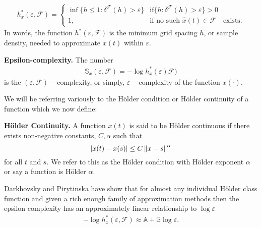   \begin{align*}
    h_x^*(\varepsilon, \mathcal{F}) = \begin{cases}
      \inf \{ h \leq 1 : \delta^{\mathcal{F}}(h) > \varepsilon \} & \text{if} 
      \{ h : \delta^{\mathcal{F}}(h) > \varepsilon \} > 0  \\ 
        1, &  \text{if no such } \hat x(t) \in \mathcal{F} \hspace{1em}\text{exists.}
    \end{cases}
  \end{align*}
  In words, the function $h^*(\varepsilon, \mathcal{F})$ is the minimum grid spacing $h$, or sample density, needed to approximate $x(t)$ within $\varepsilon$. 
  \begin{defn}{\textbf{Epsilon-complexity.} }\label{def:ecomplexity}
  The number
  \begin{align}
    \mathbb{S}_x(\varepsilon, \mathcal{F}) =  
    -\log h_x^*(\varepsilon) 
    \mathcal{F})
  \end{align}
  is the $(\varepsilon, \mathcal{F})-$complexity, 
  or simply, $\varepsilon-$complexity of the function $x(\cdot)$. 
  \end{defn}

  We will be referring variously to the H\"older condition or 
  H\"older continuity of a function which we now define:
  \begin{defn}{\textbf{H\"older Continuity.} }\label{def:holder}
    A function $x(t)$ is said to be H\"older continuous if
  there exists non-negative constants, $C, \alpha$ such that 
  \[
      |x(t) - x(s)| \leq C\left\lVert x -s\right\rVert^{\alpha}
  \]
    for all $t$ and $s$.
  We refer to this as the H\"older condition with H\"older 
  exponent $\alpha$ or say a function is H\"older $\alpha$.
  \end{defn}
   Darkhovsky and Pirytinska have show that for almost any
  individual H\"older class function and given a rich 
  enough family of approximation methods  
  then the epsilon complexity has an approximately linear
  relationship to $\log \varepsilon$\cite{darkhovsky2013}
  \begin{align} \label{eq:linear-ecomplex}
      -\log h_x^*(\varepsilon, \mathcal{F}) \approx \mathbb{A} + 
    \mathbb{B}\log \varepsilon.  
  \end{align}
  
